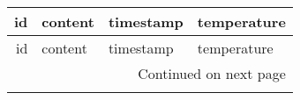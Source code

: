 \begin{longtable}{rlll}
\toprule
 id &                                                                                                                                                                                                                                                                                                                                                                                                                                                                                                                                                                                                                                                                                                                                                                                                                                                                                                                                                             content &      timestamp & temperature \\
\midrule
\endfirsthead

\toprule
 id &                                                                                                                                                                                                                                                                                                                                                                                                                                                                                                                                                                                                                                                                                                                                                                                                                                                                                                                                                             content &      timestamp & temperature \\
\midrule
\endhead
\midrule
\multicolumn{4}{r}{{Continued on next page}} \\
\midrule
\endfoot


\end{longtable}
